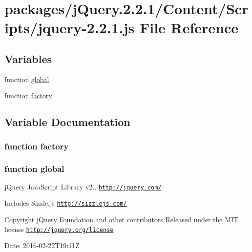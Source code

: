 \hypertarget{jquery-2_82_81_8js}{}\section{packages/j\+Query.2.2.1/\+Content/\+Scripts/jquery-\/2.2.1.js File Reference}
\label{jquery-2_82_81_8js}
\subsection*{Variables}
\begin{DoxyCompactItemize}
\item 
function \hyperlink{jquery-2_82_81_8js_a57efe929cc6b44042891d05e15cec785}{global}
\item 
function \hyperlink{jquery-2_82_81_8js_abf075bdbe59fd2c3336ed052c9c72b31}{factory}
\end{DoxyCompactItemize}


\subsection{Variable Documentation}
\subsubsection[{\texorpdfstring{factory}{factory}}]{\setlength{\rightskip}{0pt plus 5cm}function factory}\hypertarget{jquery-2_82_81_8js_abf075bdbe59fd2c3336ed052c9c72b31}{}\label{jquery-2_82_81_8js_abf075bdbe59fd2c3336ed052c9c72b31}
\subsubsection[{\texorpdfstring{global}{global}}]{\setlength{\rightskip}{0pt plus 5cm}function global}\hypertarget{jquery-2_82_81_8js_a57efe929cc6b44042891d05e15cec785}{}\label{jquery-2_82_81_8js_a57efe929cc6b44042891d05e15cec785}
j\+Query Java\+Script Library v2.. \href{http://jquery.com/}{\tt http\+://jquery.\+com/}

Includes Sizzle.\+js \href{http://sizzlejs.com/}{\tt http\+://sizzlejs.\+com/}

Copyright j\+Query Foundation and other contributors Released under the M\+IT license \href{http://jquery.org/license}{\tt http\+://jquery.\+org/license}

Date\+: 2016-\/02-\/22\+T19\+:11Z 